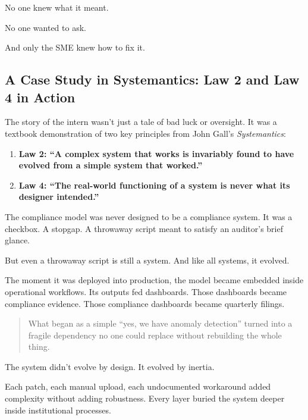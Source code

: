     No one knew what it meant.
    
    No one wanted to ask.
    
    And only the SME knew how to fix it.

    




    \subsection{A Case Study in Systemantics: Law 2 and Law 4 in Action}

    The story of the intern wasn’t just a tale of bad luck or oversight. It was a textbook demonstration of two key principles from John Gall’s \textit{Systemantics}:
    
    \begin{enumerate}
        \item \textbf{Law 2: “A complex system that works is invariably found to have evolved from a simple system that worked.”}
        \item \textbf{Law 4: “The real-world functioning of a system is never what its designer intended.”}
    \end{enumerate}
    
    The compliance model was never designed to be a compliance system.  
    It was a checkbox.  
    A stopgap.  
    A throwaway script meant to satisfy an auditor’s brief glance.
    
    But even a throwaway script is still a system.  
    And like all systems, it evolved.
    
    \medskip
    
    The moment it was deployed into production, the model became embedded inside operational workflows.  
    Its outputs fed dashboards.  
    Those dashboards became compliance evidence.  
    Those compliance dashboards became quarterly filings.
    
    \begin{quote}
    What began as a simple “yes, we have anomaly detection” turned into a fragile dependency no one could replace without rebuilding the whole thing.
    \end{quote}
    
    The system didn’t evolve by design.  
    It evolved by inertia.
    
    Each patch, each manual upload, each undocumented workaround added complexity without adding robustness.  
    Every layer buried the system deeper inside institutional processes.
    
